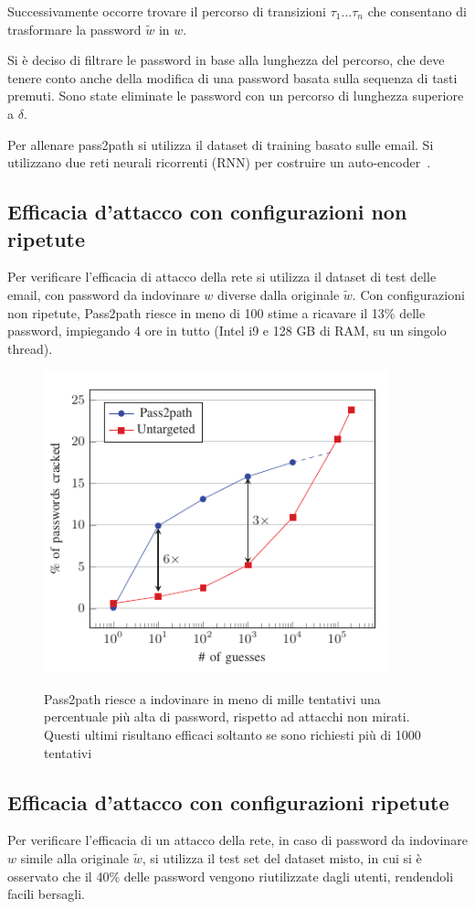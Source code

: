 Successivamente occorre trovare il percorso di transizioni  $\tau_1...\tau_n$ che consentano di trasformare la password $\tilde{w}$ in $w$.

Si è deciso di filtrare le password in base alla lunghezza del percorso, che deve tenere conto anche della modifica di una password basata sulla sequenza di tasti premuti. Sono state eliminate le password con un percorso di lunghezza superiore a $\delta$.

Per allenare pass2path si utilizza il dataset di training basato sulle email.
Si utilizzano due reti neurali ricorrenti (RNN) per costruire un auto-encoder~\cite{Sherstinsky_2020}.

\subsection{Efficacia d'attacco con configurazioni non ripetute}
Per verificare l'efficacia di attacco della rete si utilizza il dataset di test delle email, con password da indovinare $w$ diverse dalla originale $\tilde{w}$.
Con configurazioni non ripetute, Pass2path riesce in meno di 100 stime a ricavare
il 13\% delle password, impiegando 4 ore in tutto (Intel i9 e 128 GB di RAM, su un singolo thread).
\begin{figure}[h]
    \centering
    \includegraphics[width=10cm]{./immagini/pass2path.png}
    \label{pass2path}
    \caption{Pass2path riesce a indovinare in meno di mille tentativi una percentuale più alta di password, rispetto ad attacchi non mirati. Questi ultimi risultano efficaci soltanto se sono richiesti più di 1000 tentativi~\cite{biijeta}}
\end{figure}

\subsection{Efficacia d'attacco con configurazioni ripetute}
Per verificare l'efficacia di un attacco della rete, in caso di password da indovinare $w$ simile alla originale $\tilde{w}$, si utilizza il test set del dataset misto, in cui si è osservato che il 40\% delle password vengono riutilizzate dagli utenti, rendendoli facili bersagli.

